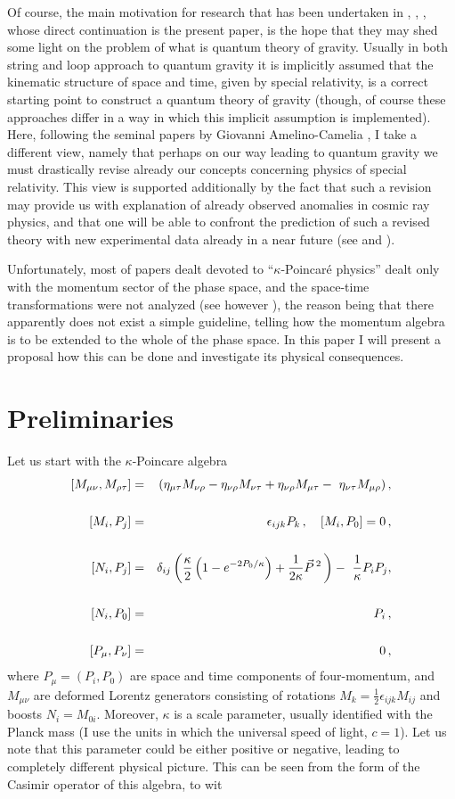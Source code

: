 \documentclass[a4paper,a4paper]{article}
\begin{document}
Of course, the main motivation for research that has been undertaken in \cite{gac1}, \cite{gac2}, \cite{jkgminl}, whose direct continuation is the present paper, is the hope that they may shed some light on the problem of what is quantum theory of gravity. Usually in both string and loop approach to quantum gravity it is implicitly assumed that the kinematic structure of space and time, given by special relativity, is a correct starting point to construct a quantum theory of gravity (though, of course these approaches differ in a way in which this implicit assumption is implemented). Here, following the seminal papers by Giovanni Amelino-Camelia \cite{gac1}, \cite{gac2} I take a different view, namely that perhaps on our way leading to quantum gravity we must drastically revise already our concepts concerning physics of special relativity. This view is supported additionally by the fact that such a revision may provide us with explanation of already observed anomalies in cosmic ray physics,  and that one will be able to confront the prediction of such a revised theory with new experimental data already in a near future (see \cite{gacpir} and \cite{gacnew}).

Unfortunately, most of  papers dealt devoted to ``$\kappa$-Poincar\'e physics'' dealt only with the momentum sector of the  phase space, and the space-time transformations were not analyzed (see however \cite{maru}), the reason being that there apparently does not exist a simple guideline, telling how the momentum algebra is to be extended to the whole of the phase space. In this paper I will  present a proposal how this can be done and investigate its physical consequences.

\section{Preliminaries}

Let us start with the $\kappa$-Poincare algebra
\begin{eqnarray} \label{1}
  [M_{\mu\nu},M_{\rho\tau}]
=&&
\displaystyle
\left(\eta_{\mu\tau}M_{\nu\rho} -
\eta_{\nu\rho}M_{\nu\tau} +\eta_{\nu\rho}M_{\mu\tau}
  -\  \eta_{\nu\tau}M_{\mu\rho} \right),
\cr \cr
 [M_{i},P_{j}] =&&  \epsilon_{ijk}P_{k}\, ,
\quad [M_{i},P_{0}]= 0\, ,
\cr \cr
\displaystyle
  [N_{i}, P_{j}] = && \delta_{ij}
 \left( {\kappa\over 2} \left(
 1 -e^{-2{P_{0}/ \kappa}}
\right) + {1\over 2\kappa} \vec{P}\, ^{ 2}\, \right)
- \ {1\over \kappa} P_{i}P_{j} ,
\cr \cr
 \left[N_{i},P_{0}\right] = && P_{i}\, ,
\cr \cr
\displaystyle
  [P_{\mu},P_{\nu}] = && 0\, ,
\end{eqnarray}
where $P_\mu =(P_i, P_0)$ are space and time components of
four-momentum, and $M_{\mu\nu}$ are deformed Lorentz generators consisting of
rotations $M_k = \frac12\epsilon_{ijk}M_{ij} $ and boosts
$N_i = M_{0i}$. Moreover, $\kappa$ is a scale parameter, usually identified with the Planck mass (I use the units in which the universal speed of light, $c=1$). Let us note that this parameter could be either positive or negative, leading to completely different physical picture. This can be seen from the form of the Casimir operator of this algebra, to wit
\end{document}
